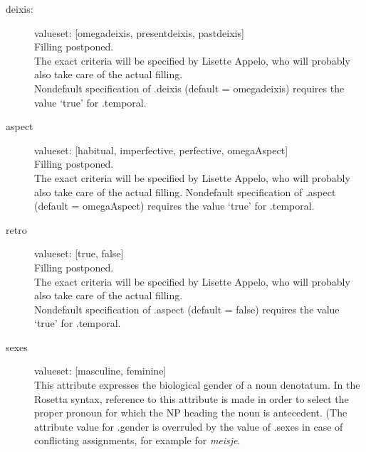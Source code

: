 \begin{description}
\newpage
\item 
[deixis:]\mbox{}

valueset: [omegadeixis, presentdeixis, pastdeixis]\\

Filling postponed.\\

The exact criteria will be specified by Lisette Appelo, who will probably also
take care of the actual filling. \\
Nondefault specification of .deixis (default = omegadeixis) requires
the value `true' for .temporal.

\newpage
\item 
[aspect]\mbox{}

valueset: [habitual, imperfective, perfective, omegaAspect]\\

Filling postponed.\\

The exact criteria will be specified by Lisette Appelo, who will probably also
take care of the actual filling. 
Nondefault specification of .aspect 
(default = omegaAspect) requires the value `true' for .temporal.

\newpage
\item 
[retro]\mbox{}

valueset: [true, false]\\

Filling postponed.\\

The exact criteria will be specified by Lisette Appelo, who will probably also
take care of the actual filling. \\

Nondefault specification of .aspect 
(default = false) requires the value `true' for .temporal.


\newpage
\item 
[sexes]\mbox{}
           
valueset: [masculine, feminine]\\

This attribute expresses the biological gender of a noun denotatum. 
In the Rosetta  syntax, reference to this attribute is
made
in order to select the proper pronoun for which the NP heading the noun
is antecedent. (The attribute value for .gender is overruled by the value of 
.sexes in case of conflicting assignments, for example for {\em meisje}.\\


\end{description}

